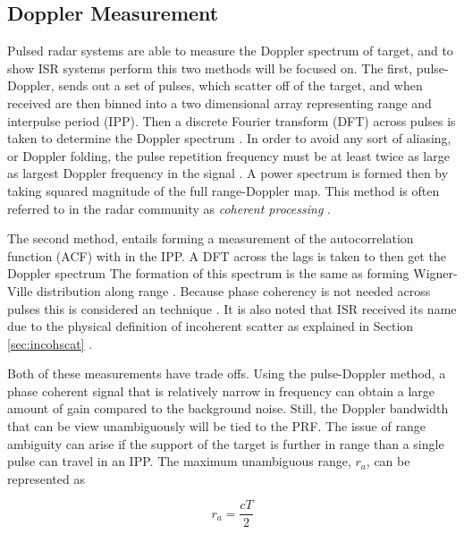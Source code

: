 \subsection{Doppler Measurement}

Pulsed radar systems are able to measure the Doppler spectrum of target, and to show ISR systems perform this two methods will be focused on. The first, pulse-Doppler, sends out a set of pulses, which scatter off of the target, and when received are then binned into a two dimensional array representing range and interpulse period (IPP). Then a discrete Fourier transform (DFT) across pulses is taken to determine the Doppler spectrum \cite{richards2014fundamentals}. In order to avoid any sort of aliasing, or Doppler folding, the pulse repetition frequency must be at least twice as large as largest Doppler frequency in the signal \cite{dtsp:openhiem}. A power spectrum is formed then by taking squared magnitude of the full range-Doppler map. This method is often referred to in the radar community as \textit{coherent processing} \cite{richards2014fundamentals,richards2010principles,richards2014principles,skolnik2008radar}. 

The second method, entails forming a measurement of the autocorrelation function (ACF) with in the IPP. A DFT across the lags is taken to then get the Doppler spectrum The formation of this spectrum is the same as forming Wigner-Ville distribution along range \cite{TFAcohen}. Because phase coherency is not needed across pulses this is considered an  technique \cite{richards2014fundamentals,richards2010principles,richards2014principles,skolnik2008radar}. It is also noted that ISR received its name due to the physical definition of incoherent scatter as explained in Section \ref{sec:incohscat} \cite{gordon58,dougherty:farley1960}.

Both of these measurements have trade offs. Using the pulse-Doppler method, a phase coherent signal that is relatively narrow in frequency can obtain a large amount of gain compared to the background noise. Still, the Doppler bandwidth that can be view unambiguously will be tied to the PRF. The issue of range ambiguity can arise if the support of the target is further in range than a single pulse can travel in an IPP. The maximum unambiguous range, $r_a$, can be represented as 

\begin{equation}
\label{eqn:maxuar}
r_a =  \frac{cT}{2}
\end{equation}

